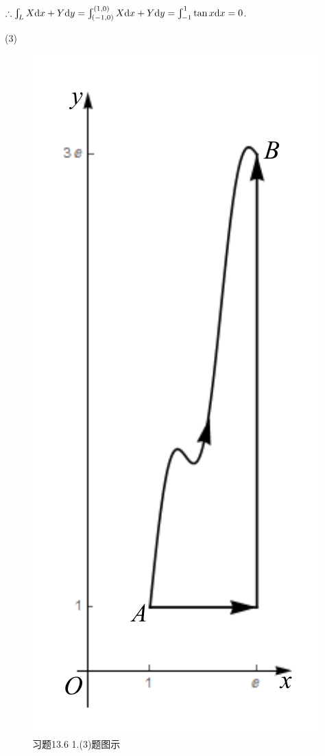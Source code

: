 \documentclass[12pt,UTF8,fleqn]{ctexart}
\newcommand{\Int}[4]{\varint\nolimits_{#1}^{#2}#3\mathrm d#4}
\newcommand{\BLInt}[2]{\varint\nolimits_{#1}#2}
\newcommand{\md}[1]{\mathrm d#1}
\begin{document}
\begin{enumerate}
$\therefore\BLInt L{X\md x+Y\md y}=\varint_{(-1,0)}^{(1,0)}{X\md x+Y\md y}=\Int{-1}1{\tan x}x=0$.

(3)
\begin{figure}[H]
\begin{center}
\includegraphics[height=0.5\textheight]{Figures25/Fig13-6-1-3.pdf}
\end{center}
\caption{习题13.6 1.(3)题图示}
\label{13-6-1-3}
\end{figure}


\end{enumerate}
\end{document}
